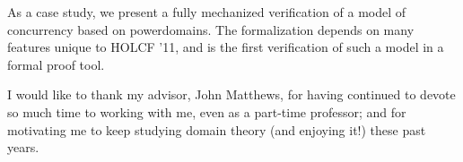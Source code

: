 \documentclass[letterpaper,12pt]{report}
\newcommand{\HOLCF}[1]{HOLCF '#1}
\begin{document}
As a case study, we present a fully mechanized verification of a model of concurrency based on powerdomains. The formalization depends on many features unique to \HOLCF{11}, and is the first verification of such a model in a formal proof tool.

 I would like to thank my advisor, John Matthews, for having continued to devote so much time to working with me, even as a part-time professor; and for motivating me to keep studying domain theory (and enjoying it!) these past years.

\afterpreface

\body









\singlespace




\appendix
\cleardoublepage
{}
{}
\printindex[def]

\cleardoublepage
{}
{}
\printindex[thm]
\end{document}

